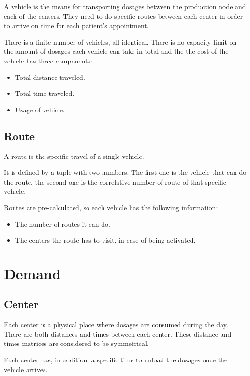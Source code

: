 A vehicle is the means for transporting dosages between the production node and each of the centers. They need to do specific routes between each center in order to arrive on time for each patient's appointment.

There is a finite number of vehicles, all identical. There is no capacity limit on the amount of dosages each vehicle can take in total and the the cost of the vehicle has three components:

\begin{itemize}
	\item Total distance traveled.
	\item Total time traveled.
	\item Usage of vehicle.
\end{itemize}

\subsection{Route}
\label{def:route}

A route is the specific travel of a single vehicle.

It is defined by a tuple with two numbers. The first one is the vehicle that can do the route, the second one is the correlative number of route of that specific vehicle.

Routes are pre-calculated, so each vehicle has the following information:

\begin{itemize}
	\item The number of routes it can do.
	\item The centers the route has to visit, in case of being activated.
\end{itemize}


\section{Demand}

\subsection{Center}

Each center is a physical place where dosages are consumed during the day. There are both distances and times between each center. These distance and times matrices are considered to be symmetrical.

Each center has, in addition, a specific time to unload the dosages once the vehicle arrives.

